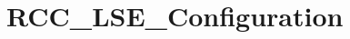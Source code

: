 \hypertarget{group___r_c_c___l_s_e___configuration}{\section{R\-C\-C\-\_\-\-L\-S\-E\-\_\-\-Configuration}
\label{group___r_c_c___l_s_e___configuration}
}
